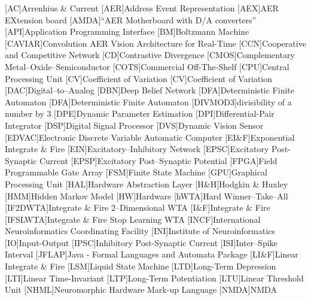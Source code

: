 [AC]{Arrenhius \& Current}
[AER]{Address Event Representation}
[AEX]{AER EXtension board}
[AMDA]{``AER Motherboard with D/A converters''}
[API]{Application Programming Interface}
[BM]{Boltzmann Machine}
[CAVIAR]{Convolution AER Vision Architecture for Real-Time}
[CCN]{Cooperative and Competitive Network}
[CD]{Contrastive Divergence}
[CMOS]{Complementary Metal--Oxide--Semiconductor}
[COTS]{Commercial Off-The-Shelf}
[CPU]{Central Processing Unit}
[CV]{Coefficient of Variation}
[CV]{Coefficient of Variation}
[DAC]{Digital--to--Analog}
[DBN]{Deep Belief Network}
[DFA]{Deterministic Finite Automaton}
[DFA]{Deterministic Finite Automaton}
[DIVMOD3]{divisibility of a number by 3}
[DPE]{Dynamic Parameter Estimation}
[DPI]{Differential-Pair Integrator}
[DSP]{Digital Signal Processor}
[DVS]{Dynamic Vision Sensor}
[EDVAC]{Electronic Discrete Variable Automatic Computer}
[EI\&F]{Exponential Integrate \& Fire}
[EIN]{Excitatory--Inhibitory Network}
[EPSC]{Excitatory Post-Synaptic Current}
[EPSP]{Excitatory Post--Synaptic Potential}
[FPGA]{Field Programmable Gate Array}
[FSM]{Finite State Machine}
[GPU]{Graphical Processing Unit}
[HAL]{Hardware Abstraction Layer}
[H\&H]{Hodgkin \& Huxley}
[HMM]{Hidden Markov Model}
[HW]{Hardware}
[hWTA]{Hard Winner--Take--All}
[IF2DWTA]{Integrate \& Fire 2--Dimensional WTA}
[I\&F]{Integrate \& Fire}
[IFSLWTA]{Integrate \& Fire Stop Learning WTA}
[INCF]{International Neuroinformatics Coordinating Facility}
[INI]{Institute of Neuroinformatics}
[IO]{Input-Output}
[IPSC]{Inhibitory Post-Synaptic Current}
[ISI]{Inter--Spike Interval}
[JFLAP]{Java - Formal Languages and Automata Package}
[LI\&F]{Linear Integrate \& Fire}
[LSM]{Liquid State Machine}
[LTD]{Long-Term Depression}
[LTI]{Linear Time-Invariant}
[LTP]{Long-Term Potentiation}
[LTU]{Linear Threshold Unit}
[NHML]{Neuromorphic Hardware Mark-up Language}
[NMDA]{NMDA}
